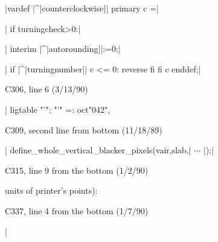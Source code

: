 {\ninepoint\noindent
|vardef |^|counterclockwise|| primary c =|\par\noindent
| if turningcheck>0:|\par\noindent
|  interim |^|autorounding||:=0;|\par\noindent
|  if |^|turningnumber|| c <= 0: reverse fi fi c enddef;|

\bugonpage C306, line 6 (3/13/90)

\ninepoint\noindent
| ligtable "'": "'" =: oct"042",                         %

\bugonpage C309, second line from bottom (11/18/89)

\ninepoint\noindent
| define_whole_vertical_blacker_pixels(vair,slab,| $\cdots$ |);|

\bugonpage C315, line 9 from the bottom (1/2/90)

\ninepoint\noindent
units of printer's points):

\bugonpage C337, line 4 from the bottom (1/7/90)

\ninepoint\noindent
|\def\startfont{\font\testfont=\fontname \spaceskip=0pt|

\hsize=35pc
\def\\#1{\hbox{\it#1\/\kern.05em}} %
\def\to{\mathrel{.\,.}} %

\hsize=29pc
\def\dashto{\mathrel{\hbox{-\kern-.05em}\mkern3.9mu\hbox{-\kern-.05em}}}

\bugonpage E325, line 13 (3/13/90)

\ninepoint\noindent
{\bf if} \\{serifs}: $x_{3r}=\max(x_{1r},{\rm hround}(x_1+.5\\{dot\_diam}
 -.2\\{jut})-.5\\{tiny})$\par\noindent
{\bf else}: $x_3=x_1-.5$ {\bf fi};

\bugonpage E483, line 4 (3/13/90)

\ninepoint
\rightline{\% Character codes \oct{000}--\oct{100} and \oct{133}--\oct{177}
 are generated.}

\bugonpage E544, line 5 (3/13/90)

\ninepoint\noindent
\hskip 3em\vdots\hskip2em\raise2pt\hbox{(the rest of the
 program for `$\gamma$' in |greekl| comes here)}

\bugonpage E557, line 9 (3/13/90)

\ninepoint
\rightline{\sl`Nevermore---Ah nevermore.'\thinspace''}

}}

